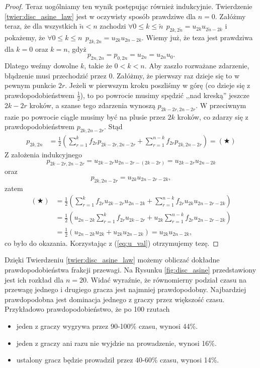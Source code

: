 \documentclass[a4paper,11pt,twoside]{book}
\theoremstyle{definition}
\begin{document}
\begin{proof}
Teraz uogólniamy ten wynik postępując również indukcyjnie. Twierdzenie \ref{twier:disc_asine_law} jest w oczywisty sposób prawdziwe dla $n=0$. Załóżmy teraz, że dla wszystkich $\tilde{n} < n$ zachodzi $\forall 0 \leq k \leq \tilde{n}\ \ p_{2k,2\tilde{n}} = u_{2k} u_{2\tilde{n}-2k}$ i pokażemy, że $\forall 0 \leq k \leq n\ \ p_{2k,2n} = u_{2k} u_{2n-2k}$. 
Wiemy już, że teza jest prawdziwa dla $k = 0$ oraz $k = n$, gdyż
\[  p_{2n,2n} = p_{0,2n} = u_{2n} = u_{2n}u_0. \]
Dlatego weźmy dowolne $k$, takie że $0 < k < n$. Aby zaszło rozważane zdarzenie, błądzenie musi przechodzić przez 0. Załóżmy, że pierwszy raz dzieje się to w pewnym punkcie $2r$. Jeżeli w pierwszym kroku poszliśmy w górę (co dzieje się z prawdopodobieństwem $\frac{1}{2}$), to po powrocie musimy spędzić ,,nad kreską'' jeszcze $2k-2r$ kroków, a szanse tego zdarzenia wynoszą $p_{2k-2r, 2n-2r}$. W przeciwnym razie po powrocie ciągle musimy być na plusie przez $2k$ kroków, co zdarzy się z prawdopodobieństwem $p_{2k,2n-2r}$. Stąd
\begin{equation*}
 \begin{split}
  p_{2k,2n} &= \frac{1}{2} \left( \sum_{r=1}^k f_{2r} p_{2k-2r,2n-2r} + \sum_{r=1}^{n-k} f_{2r} p_{2k, 2n-2r} \right) = (\bigstar)
 \end{split}
\end{equation*}
\noindent Z założenia indukcyjnego
\[ p_{2k-2r,2n-2r} = u_{2k-2r}u_{2n-2r - (2k-2r)} = u_{2k-2r}u_{2n-2k} \]
oraz
\[ p_{2k,2n-2r} = u_{2k}u_{2n-2r-2k}, \]
zatem
\begin{equation*}
 \begin{split}
  (\bigstar) &= \frac{1}{2} \left( \sum_{r=1}^k f_{2r} u_{2k-2r}u_{2n-2k} + \sum_{r=1}^{n-k} f_{2r} u_{2k}u_{2n-2r-2k} \right) \\
             &= \frac{1}{2} \left( u_{2n-2k}\sum_{r=1}^k f_{2r} u_{2k-2r} + u_{2k}\sum_{r=1}^{n-k} f_{2r} u_{2n-2r-2k} \right) \\
             &= \frac{1}{2} \left( u_{2n-2k}u_{2k} + u_{2k} u_{2n-2k} \right) = u_{2k} u_{2n-2k},
 \end{split}
\end{equation*}
co było do okazania. Korzystając z (\ref{eq:u_val}) otrzymujemy tezę.
\end{proof}

Dzięki Twierdzeniu \ref{twier:disc_asine_law} możemy obliczać dokładne prawdopodobieństwa frakcji przewagi. Na Rysunku \ref{fig:disc_asine} przedstawiony jest ich rozkład dla $n=20$. Widać wyraźnie, że równomierny podział czasu na przewagę jednego i drugiego gracza jest najmniej prawdopodobny. Najbardziej prawdopodobna jest dominacja jednego z graczy przez większość czasu. Przykładowo prawdopodobieństwo, że po 100 rzutach
\begin{itemize}
 \item jeden z graczy wygrywa przez 90-100\% czasu, wynosi 44\%.
 \item jeden z graczy ani razu nie wyjdzie na prowadzenie, wynosi 16\%.
 \item ustalony gracz będzie prowadził przez 40-60\% czasu, wynosi 14\%.
\end{itemize}
\end{document}
